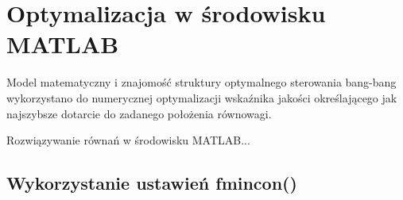 \section{Optymalizacja w środowisku \textsc{MATLAB}}

Model matematyczny i znajomość struktury optymalnego sterowania bang-bang wykorzystano do numerycznej optymalizacji wskaźnika jakości określającego jak najszybsze dotarcie do zadanego położenia równowagi.

Rozwiązywanie równań w środowisku \textsc{MATLAB}...


\subsection{Wykorzystanie ustawień fmincon()}



